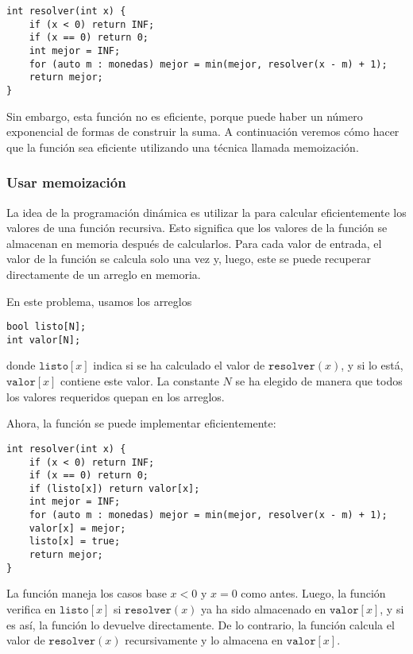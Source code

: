 \begin{lstlisting}
int resolver(int x) {
    if (x < 0) return INF;
    if (x == 0) return 0;
    int mejor = INF;
    for (auto m : monedas) mejor = min(mejor, resolver(x - m) + 1);
    return mejor;
}
\end{lstlisting}

Sin embargo, esta función no es eficiente,
porque puede haber un número exponencial de formas
de construir la suma. A continuación veremos cómo hacer que la
función sea eficiente utilizando una técnica llamada memoización.

\subsubsection{Usar memoización}


La idea de la programación dinámica es utilizar la
 para calcular eficientemente
los valores de una función recursiva.
Esto significa que los valores de la función
se almacenan en memoria después de calcularlos.
Para cada valor de entrada, el valor de la función
se calcula solo una vez y, luego, este se puede recuperar
directamente de un arreglo en memoria.

En este problema, usamos los arreglos
\begin{lstlisting}
bool listo[N];
int valor[N];
\end{lstlisting}

donde $\texttt{listo}[x]$ indica
si se ha calculado el valor de $\texttt{resolver}(x)$,
y si lo está, $\texttt{valor}[x]$
contiene este valor.
La constante $N$ se ha elegido de manera que
todos los valores requeridos quepan en los arreglos.

Ahora, la función se puede implementar eficientemente:

\begin{lstlisting}
int resolver(int x) {
    if (x < 0) return INF;
    if (x == 0) return 0;
    if (listo[x]) return valor[x];
    int mejor = INF;
    for (auto m : monedas) mejor = min(mejor, resolver(x - m) + 1);
    valor[x] = mejor;
    listo[x] = true;
    return mejor;
}
\end{lstlisting}

La función maneja los casos base
$x<0$ y $x=0$ como antes.
Luego, la función verifica en
$\texttt{listo}[x]$ si
$\texttt{resolver}(x)$ ya ha sido almacenado
en $\texttt{valor}[x]$,
y si es así, la función lo devuelve directamente.
De lo contrario, la función calcula el valor
de $\texttt{resolver}(x)$
recursivamente y lo almacena en $\texttt{valor}[x]$.

